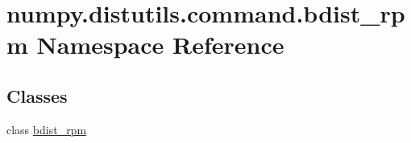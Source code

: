 \hypertarget{namespacenumpy_1_1distutils_1_1command_1_1bdist__rpm}{}\section{numpy.\+distutils.\+command.\+bdist\+\_\+rpm Namespace Reference}
\label{namespacenumpy_1_1distutils_1_1command_1_1bdist__rpm}
\subsection*{Classes}
\begin{DoxyCompactItemize}
\item 
class \hyperlink{classnumpy_1_1distutils_1_1command_1_1bdist__rpm_1_1bdist__rpm}{bdist\+\_\+rpm}
\end{DoxyCompactItemize}
